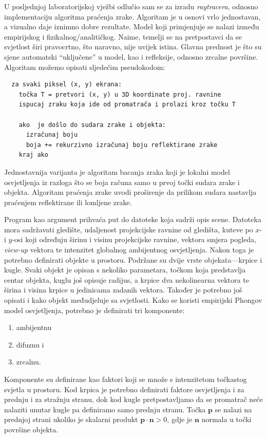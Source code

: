 \documentclass[a4paper,12pt]{article}
\begin{document}
U posljednjoj laboratorijskoj vježbi odlučio sam se za izradu {\sl raytracera}, odnosno implementaciju
algoritma praćenja zrake. Algoritam je u osnovi vrlo jednostavan, a vizualno daje iznimno dobre rezultate.
Model koji primjenjuje se nalazi između empirijskog i fizikalnog/analitičkog. Naime, temelji se
na pretpostavci da se svjetlost širi pravocrtno, što naravno, nije uvijek istina. Glavna prednost
je što su sjene automatski ``uključene'' u model, kao i refleksije, odnosno zrcalne površine.
Algoritam možemo opisati sljedećim pseudokodom:
\begin{verbatim}
  za svaki piksel (x, y) ekrana:
    točka T = pretvori (x, y) u 3D koordinate proj. ravnine
    ispucaj zraku koja ide od promatrača i prolazi kroz točku T

    ako  je došlo do sudara zrake i objekta:
      izračunaj boju
      boja += rekurzivno izračunaj boju reflektirane zrake
    kraj ako 
\end{verbatim}

Jednostavnija varijanta je algoritam bacanja zraka koji je lokalni model osvjetljenja iz razloga
što se boja računa samo u prvoj točki sudara zrake i objekta. Algoritam praćenja zrake uvodi
proširenje da prilikom sudara nastavlja praćenjem reflektirane ili lomljene zrake.

Program kao argument prihvaća put do datoteke koja sadrži opis scene. Datoteka mora sadržavati
gledište, udaljenost projekcijske ravnine od gledišta, kuteve po $x$- i $y$-osi koji određuju
širinu i visinu projekcijske ravnine, vektora smjera pogleda, {\sl view-up} vektora te intenzitet
globalnog ambijentnog osvjetljenja. Nakon toga je potrebno definirati objekte u prostoru.
Podržane su dvije vrste objekata---krpice i kugle. Svaki objekt je opisan s nekoliko parametara,
točkom koja predstavlja centar objekta, kuglu još opisuje radijus, a krpice dva nekolinearna vektora
te širina i visina krpice u jedinicama zadanih vektora.
Također je potrebno još opisati i kako objekt međudjeluje sa svjetlosti. Kako se koristi empirijski
Phongov model osvjetljenja, potrebno je definirati tri komponente:
\begin{enumerate}
  \item ambijentnu
  \item difuznu i
  \item zrcalnu.
\end{enumerate}

Komponente su definirane kao faktori koji se množe s intenzitetom točkastog svjetla u prostoru.
Kod krpica je potrebno definirati faktore osvjetljenja i za prednju i za stražnju stranu, dok
kod kugle pretpostavljamo da se promatrač neće nalaziti unutar kugle pa definiramo samo prednju
stranu. Točka $\mathbf{p}$ se nalazi na prednjoj strani ukoliko je skalarni produkt
$\mathbf{p} \cdot \mathbf{n} > 0$, gdje je $\mathbf{n}$ normala u točki površine objekta.
\end{document}
